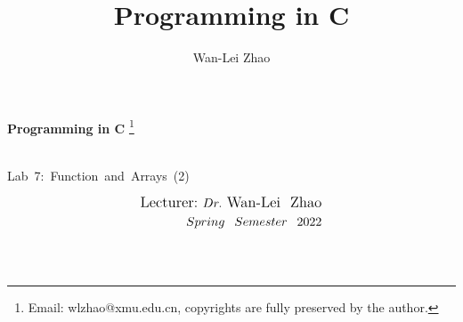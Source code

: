 \documentclass[t]{beamer}
\title{Programming in C}
\author{Wan-Lei Zhao}
\newcommand\blfootnote[1]{
  \begingroup
  \renewcommand\thefootnote{}\footnote{#1}
  \addtocounter{footnote}{-1}
  \endgroup
}
\begin{document}
\begin{frame}
   \begin{center}
    \vspace{24pt}
    \Huge\textbf{Programming in C}\blfootnote{Email: wlzhao@xmu.edu.cn, copyrights are fully preserved by the author.}\\
     \Huge{\mbox{Lab 7: Function and Arrays (2)}}
    \vspace{36pt}
  \end{center}
  \begin{align*}
   \vspace{18pt}
      \large{\mbox{Lecturer:}~Dr.~\mbox{Wan-Lei~~Zhao}} \\
      \large{Spring~~Semester~~2022} \\
   \vspace{30pt}
  \end{align*}
\end{frame}



\section{}
\end{document}
